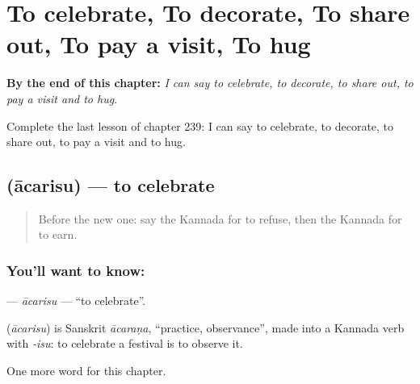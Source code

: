 
\chapter{To celebrate, To decorate, To share out, To pay a visit, To hug}
\label{ch:ka-to-celebrate-to-decorate-to-share-out-to-pay-a-visit-to-hug}

\begin{chapteropening}
\textbf{By the end of this chapter:} \emph{I can say to celebrate, to decorate, to share out, to pay a visit and to hug.}

Complete the last lesson of chapter 239: I can say to celebrate, to decorate, to share out, to pay a visit and to hug.
\end{chapteropening}

\section[\texorpdfstring{\kn{ಆಚರಿಸು} (ācarisu)}{ಆಚರಿಸು (ācarisu)}]{ (ācarisu) — to celebrate}

\label{lesson:KA-C239-acarisu}



\begin{quote}
Before the new one: say the Kannada for to refuse, then the Kannada for to earn.
\end{quote}

\subsection*{You'll want to know: }
\textbf{} — \emph{ācarisu} — \textquotedblleft{}to celebrate\textquotedblright{}.

\begin{cousinweb}
\textbf{} (\emph{ācarisu}) is Sanskrit \emph{ācaraṇa}, \textquotedblleft{}practice, observance\textquotedblright{}, made into a Kannada verb with \emph{-isu}: to celebrate a festival is to observe it.
\end{cousinweb}

\begin{grammarlens}[title={What you've built}]
One more word for this chapter.
\end{grammarlens}


